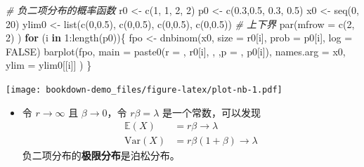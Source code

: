 \documentclass[
]{book}
\newenvironment{Shaded}{\begin{snugshade}}{\end{snugshade}}
\newcommand{\AttributeTok}[1]{\textcolor[rgb]{0.77,0.63,0.00}{#1}}
\newcommand{\CommentTok}[1]{\textcolor[rgb]{0.56,0.35,0.01}{\textit{#1}}}
\newcommand{\ConstantTok}[1]{\textcolor[rgb]{0.00,0.00,0.00}{#1}}
\newcommand{\ControlFlowTok}[1]{\textcolor[rgb]{0.13,0.29,0.53}{\textbf{#1}}}
\newcommand{\DecValTok}[1]{\textcolor[rgb]{0.00,0.00,0.81}{#1}}
\newcommand{\FloatTok}[1]{\textcolor[rgb]{0.00,0.00,0.81}{#1}}
\newcommand{\FunctionTok}[1]{\textcolor[rgb]{0.00,0.00,0.00}{#1}}
\newcommand{\NormalTok}[1]{#1}
\newcommand{\OtherTok}[1]{\textcolor[rgb]{0.56,0.35,0.01}{#1}}
\newcommand{\SpecialCharTok}[1]{\textcolor[rgb]{0.00,0.00,0.00}{#1}}
\newcommand{\StringTok}[1]{\textcolor[rgb]{0.31,0.60,0.02}{#1}}
\providecommand{\tightlist}{%
  \setlength{\itemsep}{0pt}\setlength{\parskip}{0pt}}
\begin{document}
\begin{Shaded}
\begin{Highlighting}[]
\CommentTok{\# 负二项分布的概率函数}
\NormalTok{r0 }\OtherTok{\textless{}{-}} \FunctionTok{c}\NormalTok{(}\DecValTok{1}\NormalTok{, }\DecValTok{1}\NormalTok{, }\DecValTok{2}\NormalTok{, }\DecValTok{2}\NormalTok{)}
\NormalTok{p0 }\OtherTok{\textless{}{-}} \FunctionTok{c}\NormalTok{(}\FloatTok{0.3}\NormalTok{,}\FloatTok{0.5}\NormalTok{, }\FloatTok{0.3}\NormalTok{, }\FloatTok{0.5}\NormalTok{)}
\NormalTok{x0 }\OtherTok{\textless{}{-}} \FunctionTok{seq}\NormalTok{(}\DecValTok{0}\NormalTok{, }\DecValTok{20}\NormalTok{)}
\NormalTok{ylim0 }\OtherTok{\textless{}{-}} \FunctionTok{list}\NormalTok{(}\FunctionTok{c}\NormalTok{(}\DecValTok{0}\NormalTok{,}\FloatTok{0.5}\NormalTok{),}
              \FunctionTok{c}\NormalTok{(}\DecValTok{0}\NormalTok{,}\FloatTok{0.5}\NormalTok{),}
              \FunctionTok{c}\NormalTok{(}\DecValTok{0}\NormalTok{,}\FloatTok{0.5}\NormalTok{),}
              \FunctionTok{c}\NormalTok{(}\DecValTok{0}\NormalTok{,}\FloatTok{0.5}\NormalTok{))  }\CommentTok{\# 上下界}
\FunctionTok{par}\NormalTok{(}\AttributeTok{mfrow =} \FunctionTok{c}\NormalTok{(}\DecValTok{2}\NormalTok{, }\DecValTok{2}\NormalTok{) )}
\ControlFlowTok{for}\NormalTok{ (i }\ControlFlowTok{in} \DecValTok{1}\SpecialCharTok{:}\FunctionTok{length}\NormalTok{(p0))\{}
\NormalTok{  fpo }\OtherTok{\textless{}{-}} \FunctionTok{dnbinom}\NormalTok{(x0, }\AttributeTok{size =}\NormalTok{ r0[i], }\AttributeTok{prob =}\NormalTok{ p0[i], }\AttributeTok{log =} \ConstantTok{FALSE}\NormalTok{)}
  \FunctionTok{barplot}\NormalTok{(fpo, }
          \AttributeTok{main =} \FunctionTok{paste0}\NormalTok{(}\StringTok{\textquotesingle{}r = \textquotesingle{}}\NormalTok{, r0[i], }\StringTok{\textquotesingle{},  \textquotesingle{}}\NormalTok{,}\StringTok{\textquotesingle{}p = \textquotesingle{}}\NormalTok{, p0[i]), }
          \AttributeTok{names.arg =}\NormalTok{ x0, }\AttributeTok{ylim =}\NormalTok{ ylim0[[i]]}
\NormalTok{  )}
\NormalTok{\}}
\end{Highlighting}
\end{Shaded}

\texttt{[image: bookdown-demo\_files/figure-latex/plot-nb-1.pdf]}

\begin{itemize}
\tightlist
\item
  令 \(r\to\infty\) 且 \(\beta\to 0\)，令 \(r\beta=\lambda\) 是一个常数，可以发现
  \[
  \begin{align*}
  \mathbb{E}(X)&=r\beta \to \lambda\\
  \text{Var}(X)&=r\beta(1+\beta) \to \lambda
  \end{align*}
  \]
  负二项分布的\textbf{极限分布}是泊松分布。
\end{itemize}
\end{document}
